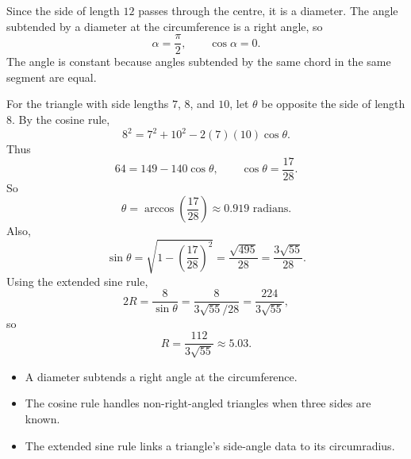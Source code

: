 \begin{solution}
Since the side of length $12$ passes through the centre, it is a diameter.
The angle subtended by a diameter at the circumference is a right angle, so
\[
\alpha=\frac{\pi}{2},
\qquad
\cos\alpha=0.
\]
The angle is constant because angles subtended by the same chord in the same
segment are equal.

For the triangle with side lengths $7$, $8$, and $10$, let $\theta$ be opposite
the side of length $8$. By the cosine rule,
\[
8^2=7^2+10^2-2(7)(10)\cos\theta.
\]
Thus
\[
64=149-140\cos\theta,
\qquad
\cos\theta=\frac{17}{28}.
\]
So
\[
\theta=\arccos\left(\frac{17}{28}\right)\approx0.919\text{ radians}.
\]
Also,
\[
\sin\theta
=\sqrt{1-\left(\frac{17}{28}\right)^2}
=\frac{\sqrt{495}}{28}
=\frac{3\sqrt{55}}{28}.
\]
Using the extended sine rule,
\[
2R=\frac{8}{\sin\theta}
=\frac{8}{3\sqrt{55}/28}
=\frac{224}{3\sqrt{55}},
\]
so
\[
R=\frac{112}{3\sqrt{55}}\approx5.03.
\]
\end{solution}

\begin{takeaways}
\begin{itemize}[leftmargin=*]
  \item A diameter subtends a right angle at the circumference.
  \item The cosine rule handles non-right-angled triangles when three sides are
        known.
  \item The extended sine rule links a triangle's side-angle data to its
        circumradius.
\end{itemize}
\end{takeaways}

